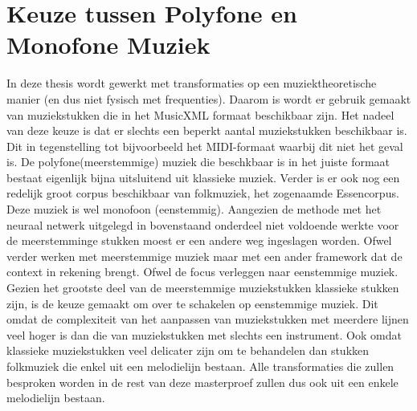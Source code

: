 \section{Keuze tussen Polyfone en Monofone Muziek}
\label{OBM:OMM}
In deze thesis wordt gewerkt met transformaties op een muziektheoretische manier (en dus niet fysisch met frequenties). Daarom is wordt er gebruik gemaakt van muziekstukken die in het MusicXML\cite{url:musicxml} formaat beschikbaar zijn. Het nadeel van deze keuze is dat er slechts een beperkt aantal muziekstukken beschikbaar is. Dit in tegenstelling tot bijvoorbeeld het MIDI-formaat\cite{url:midi} waarbij dit niet het geval is. De polyfone(meerstemmige) muziek die beschkbaar is in het juiste formaat bestaat eigenlijk bijna uitsluitend uit klassieke muziek. Verder is er ook nog een redelijk groot corpus beschikbaar van folkmuziek, het zogenaamde Essencorpus\cite{url:essen}. Deze muziek is wel monofoon (eenstemmig). Aangezien de methode met het neuraal netwerk uitgelegd in bovenstaand onderdeel niet voldoende werkte voor de meerstemminge stukken moest er een andere weg ingeslagen worden. Ofwel verder werken met meerstemmige muziek maar met een ander framework dat de context in rekening brengt. Ofwel de focus verleggen naar eenstemmige muziek. Gezien het grootste deel van de meerstemmige muziekstukken klassieke stukken zijn, is de keuze gemaakt om over te schakelen op eenstemmige muziek. Dit omdat de complexiteit van het aanpassen van muziekstukken met meerdere lijnen veel hoger is dan die van muziekstukken met slechts een instrument. Ook omdat klassieke muziekstukken veel delicater zijn om te behandelen dan stukken folkmuziek die enkel uit een melodielijn bestaan. Alle transformaties die zullen besproken worden in de rest van deze masterproef zullen dus ook uit een enkele melodielijn bestaan.

